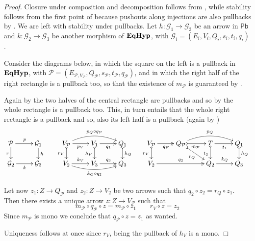 \documentclass[3p]{elsarticle}
\newcommand{\pbc}{\mathsf{Pb}}
\newcommand{\catname}[1]{\textbf{\textup{#1}}}
\newcommand{\EqHyp}{\catname{EqHyp}} %
\theoremstyle{remark}
\theoremstyle{definition}
\begin{document}
\begin{proof}\label{proof:pbmono}
	Closure under composition and decomposition follows from , while stability follows from the first point of  because pushouts along injections are also pullbacks by . We are left with stability under pullbacks. 
	Let $h\colon \mathcal{G}_1\to \mathcal{G}_3$ be an arrow in $\pbc$ and $k\colon \mathcal{G}_2\to \mathcal{G}_3$ be another morphism of $\EqHyp$, with $\mathcal{G}_{i}=(E_i, V_i, Q_i, s_i, t_i, q_i)$.
	
	Consider the diagrams below, in which the square on the left is a pullback in $\EqHyp$, with $\mathcal{P}=(E_{\mathcal{P}, V_{\mathcal{P}}}, Q_{\mathcal{P}}, s_{\mathcal{P}}, t_{\mathcal{P}}, q_{\mathcal{P}})$, and in which the right half of the right rectangle is a pullback too, so that the existence of $m_\mathcal{P}$ is guaranteed by . 
	
	Again by  the two halves of the central rectangle are pullbacks and so by  the whole rectangle is a pullback too. This, in turn entails that the whole right rectangle is a pullback and so, also its left half is a pullback (again by )
	\[
	\xymatrix@R=15pt{\mathcal{P} \ar[r]^{p} \ar[d]_{r}&  \mathcal{G}_1 \ar[d]^{h} &
		V_{\mathcal{P}} \ar@/^.4cm/[rr]^{p_Q\circ q_{\mathcal{P}}} \ar[r]_{p_V} \ar@{>->}[d]_{r_V}& V_1  \ar@{>>}[r]_{q_1} \ar@{>->}[d]_{h_V}& Q_1 \ar@{>->}[d]^{h_Q}& V_{\mathcal{P}} \ar@{>>}[r]_{q_{\mathcal{P}}} \ar@{>->}[d]_{r_V} & Q_{\mathcal{P}} \ar@{>->}[dr]_{r_Q} \ar@/^.4cm/[rr]^{p_Q} \ar@{>->}[r]_{m_{\mathcal{P}}}& T \ar[r]_{t_1} \ar@{>->}[d]_{t_2} & Q_1 \ar@{>->}[d]^{h_Q}\\
		\mathcal{G}_2 \ar[r]_{k} & \mathcal{G}_3 &   V_2  \ar@/_.3cm/[rr]_{k_Q\circ q_2}\ar[r]^{k_V}& V_3 \ar@{>>}[r]^{q_3} & Q_3 &V_2 \ar@{>>}[rr]^{q_2}&& Q_2 \ar[r]^{k_Q} & Q_3 }
	\]
	
	
	
	Let now $z_1\colon Z\to Q_{\mathcal{P}}$ and $z_2\colon Z\to V_2$ be two arrows such that $q_2\circ z_2=r_Q\circ z_1$. Then there exists a unique arrow $z\colon Z\to V_{\mathcal{P}}$ such that
	\[m_{\mathcal{P}}\circ q_{\mathcal{P}}\circ z= m_{\mathcal{P}}\circ z_1 \qquad r_V\circ z=z_2\]
	Since $m_\mathcal{P}$ is mono we conclude that $q_{\mathcal{P}}\circ z=z_1$ as wanted.
	
	Uniqueness follows at once since $r_V$, being the pullback of $h_V$ is a mono.
\end{proof}
\end{document}
